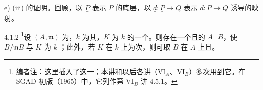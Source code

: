 e) (iii) 的证明。回顾，以 $\underline P$ 表示 $P$ 的底层，以 $\underline d:\underline P\to\underline Q$ 表示 $d:P\to Q$ 诱导的映射。
\begin{SGAresult}{}{4.1.2}
\footnote{编者注：这里插入了这一；本讲和以后各讲（VI$_A$、VI$_B$）多次用到它。在 SGAD 初版（1965）中，它列作第 VI$_B$ 讲 4.5.1。}设 $(A,\mathfrak m)$ 为，$k$ 为其，$K$ 为 $k$ 的一个。则存在一个且的 $A$- $B$，使 $B/\mathfrak mB$ 与 $K$ 为 $k$-；此外，若 $K$ 在 $k$ 上为次，则可取 $B$ 在 $A$ 上且。
\end{SGAresult}
